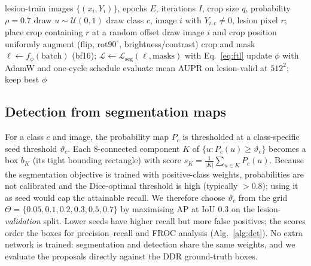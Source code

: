 \begin{algorithm}[!htbp]
\caption{Lesion-centred training of the segmentation network.}
\label{alg:seg}
\begin{algorithmic}[1]
\Require lesion-train images $\{(x_i,Y_i)\}$, epochs $E$, iterations $I$, crop size $q$, probability $\rho=0.7$
      \State draw $u\sim\mathcal U(0,1)$
       \State draw class $c$, image $i$ with $Y_{i,c}\neq0$, lesion pixel $r$; place crop containing $r$ at a random offset
      \Else \State draw image $i$ and crop position uniformly \EndIf
      \State augment (flip, rot$90^\circ$, brightness/contrast) crop and mask
    \EndFor
    \State $\ell\gets f_\phi(\text{batch})$ (bf16); $\mathcal L\gets \mathcal L_{\mathrm{seg}}(\ell,\text{masks})$ with Eq.~\eqref{eq:ftl}
    \State update $\phi$ with AdamW and one-cycle schedule
  \EndFor
   \State evaluate mean AUPR on lesion-valid at $512^2$; keep best $\phi$ \EndIf
\EndFor
\end{algorithmic}
\end{algorithm}

\subsection{Detection from segmentation maps}
\label{sec:det}
For a class $c$ and image, the probability map $P_c$ is thresholded at a class-specific seed threshold $\vartheta_c$. Each 8-connected component $K$ of $\{u:P_c(u)\ge\vartheta_c\}$ becomes a box $b_K$ (its tight bounding rectangle) with score $s_K=\frac{1}{|K|}\sum_{u\in K}P_c(u)$. Because the segmentation objective is trained with positive-class weights, probabilities are not calibrated and the Dice-optimal threshold is high (typically $>0.8$); using it as seed would cap the attainable recall. We therefore choose $\vartheta_c$ from the grid $\Theta=\{0.05,0.1,0.2,0.3,0.5,0.7\}$ by maximising AP at IoU 0.3 on the lesion-\emph{validation} split. Lower seeds have higher recall but more false positives; the scores order the boxes for precision--recall and FROC analysis (Alg.~\ref{alg:det}). No extra network is trained: segmentation and detection share the same weights, and we evaluate the proposals directly against the DDR ground-truth boxes.


